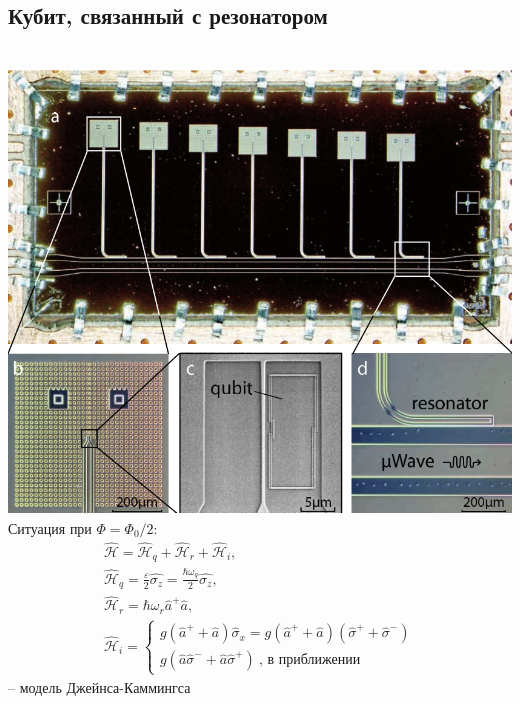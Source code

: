\documentclass[aspectratio=169, 13pt]{beamer}
\begin{document}
\subsection{Кубит, связанный с резонатором}
\begin{frame}[c]\frametitle{\secname}\framesubtitle{\subsecname}
\begin{columns}[c]

\centering
\includegraphics[width=\textwidth]{marcus_chip}
Ситуация при $\Phi = \Phi_0/2$:
\begin{gather*}
\hat{\mathcal{H}} = \hat{\mathcal{H}}_{q}+\hat{\mathcal{H}}_{r}+\hat{\mathcal{H}}_{i},\\
\hat{\mathcal{H}}_{q} = \frac{\varepsilon}{2} \hat{\sigma_z} = \frac{\hbar\omega_q}{2}\hat{\sigma_z},\\
\hat{\mathcal{H}}_{r} = \hbar\omega_r \hat a^+ \hat{a}, \\
\hat{\mathcal{H}}_{i} = 
\begin{cases} 
g(\hat a^+ + \hat{a})\hat{\sigma}_x = g(\hat a^+ + \hat{a})(\hat\sigma^++\hat\sigma^-) \\ 
g(\hat a \hat\sigma^- + \hat{a}\hat\sigma^+)\ \text{, в приближении}
\end{cases}
\end{gather*}
\hspace{1cm} -- модель Джейнса-Каммингса

\end{columns}
\end{frame}
\end{document}

